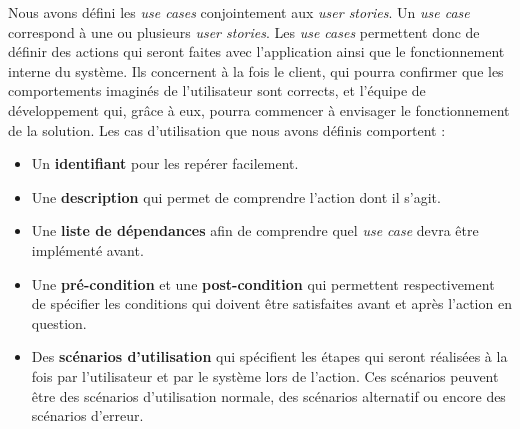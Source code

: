 \documentclass{article}
\begin{document}
Nous avons défini les \textit{use cases} conjointement aux \textit{user stories}. Un \textit{use case} correspond à une ou plusieurs \textit{user stories}. Les \textit{use cases} permettent donc de définir des actions qui seront faites avec l'application ainsi que le fonctionnement interne du système.
Ils concernent à la fois le client, qui pourra confirmer que les comportements imaginés de l'utilisateur sont corrects, et l'équipe de développement qui, grâce à eux, pourra commencer à envisager le fonctionnement de la solution.
Les cas d'utilisation que nous avons définis comportent :
\begin{itemize}
    \item Un \textbf{identifiant} pour les repérer facilement.
    \item Une \textbf{description} qui permet de comprendre l'action dont il s'agit.
    \item Une \textbf{liste de dépendances} afin de comprendre quel \textit{use case} devra être implémenté avant.
    \item Une \textbf{pré-condition} et une \textbf{post-condition} qui permettent respectivement de spécifier les conditions qui doivent être satisfaites avant et après l'action en question.
    \item Des \textbf{scénarios d'utilisation} qui spécifient les étapes qui seront réalisées à la fois par l'utilisateur et par le système lors de l'action. Ces scénarios peuvent être des scénarios d'utilisation normale, des scénarios alternatif ou encore des scénarios d'erreur.\\
\end{itemize}
\end{document}
